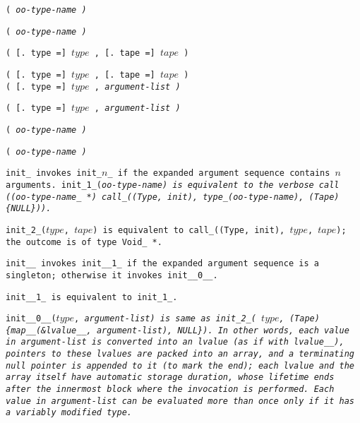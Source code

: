 
\s\s\s\s\s\tt{(} \it{oo-type-name} \tt{)}

\s\s\s\tt{(} \it{oo-type-name} \tt{)}

\s\s\s\s\s\tt{(} [\tt{. type =}]
$type$ \tt{,} [\tt{. tape =}] $tape$ \tt{)}

\s\s\s\tt{(}   [\tt{. type =}]
$type$ \tt{,} [\tt{. tape =}] $tape$ \tt{)}\\

\s\s\s\s\tt{(} [\tt{. type =}] $type$ \tt{,} \it{argument-list} \tt{)}

\s\tt{(} [\tt{. type =}] $type$ \tt{,} \it{argument-list} \tt{)}

\s\s\s\s\tt{(} \it{oo-type-name} \tt{)}

\s\s\tt{(} \it{oo-type-name} \tt{)}

\enlargethispage*{\baselineskip}
\pagebreak


\tt{init_} invokes \tt{init_}$n$\_ if the expanded
argument sequence contains $n$ arguments.
\tt{init_1_(}\it{oo-type-name}\tt{)} is equivalent
to the verbose call \tt{((}\it{oo-type-name}\_ \tt{*)
call_((Type, init), type_(}\it{oo-type-name}\tt{), (Tape)\{NULL\}))}.

\tt{init_2_(}$type$\tt{,} $tape$\tt{)} is equivalent
to \tt{call_((Type, init),} $type$\tt{,} $tape$\tt{)};
the outcome is of type \tt{Void_ *}.

\tt{init__} invokes \tt{init__1_} if the expanded argument
sequence is a singleton; otherwise it invokes \tt{init__0__}.

\tt{init__1_} is equivalent to \tt{init_1_}.

\tt{init__0__(}$type$\tt{,} \it{argument-list}\tt{)} is same as \tt{init_2_(}%
$type$\tt{,} \tt{(Tape)\{map__(&lvalue__,} \it{argument-list}\tt{), NULL\})}.
In other words, each value in \it{argument-list} is converted into an lvalue
(as if with \tt{lvalue__}), pointers to these lvalues are packed into an array,
and a terminating null pointer is appended to it (to mark the end);
each lvalue and the array itself have automatic storage duration,
whose lifetime ends after the innermost block where the invocation is performed.
Each value in \it{argument-list} can be evaluated
more than once only if it has a variably modified type.
